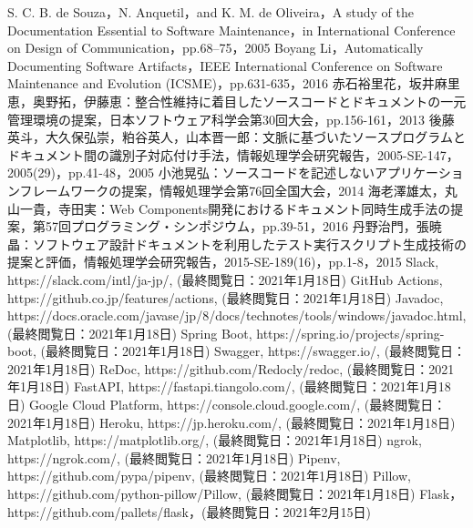 \begin{thebibliography}{30}
     S. C. B. de Souza，N. Anquetil，and K. M. de Oliveira，A study of the Documentation Essential to Software Maintenance，in International Conference on Design of Communication，pp.68–75，2005
     Boyang Li，Automatically Documenting Software Artifacts，IEEE International Conference on Software Maintenance and Evolution (ICSME)，pp.631-635，2016
     赤石裕里花，坂井麻里恵，奥野拓，伊藤恵：整合性維持に着目したソースコードとドキュメントの一元管理環境の提案，日本ソフトウェア科学会第30回大会，pp.156-161，2013
     後藤英斗，大久保弘崇，粕谷英人，山本晋一郎：文脈に基づいたソースプログラムとドキュメント間の識別子対応付け手法，情報処理学会研究報告，2005-SE-147，2005(29)，pp.41-48，2005
     小池晃弘：ソースコードを記述しないアプリケーションフレームワークの提案，情報処理学会第76回全国大会，2014
     海老澤雄太，丸山一貴，寺田実：Web Components開発におけるドキュメント同時生成手法の提案，第57回プログラミング・シンポジウム，pp.39-51，2016
     丹野治門，張暁晶：ソフトウェア設計ドキュメントを利用したテスト実行スクリプト生成技術の提案と評価，情報処理学会研究報告，2015-SE-189(16)，pp.1-8，2015
     Slack, https://slack.com/intl/ja-jp/, (最終閲覧日：2021年1月18日)
     GitHub Actions, https://github.co.jp/features/actions, (最終閲覧日：2021年1月18日)
     Javadoc, https://docs.oracle.com/javase/jp/8/docs/technotes/tools/windows/javadoc.html, (最終閲覧日：2021年1月18日)
     Spring Boot, https://spring.io/projects/spring-boot, (最終閲覧日：2021年1月18日)
     Swagger, https://swagger.io/, (最終閲覧日：2021年1月18日)
     ReDoc, https://github.com/Redocly/redoc, (最終閲覧日：2021年1月18日)
     FastAPI, https://fastapi.tiangolo.com/, (最終閲覧日：2021年1月18日)
     Google Cloud Platform, https://console.cloud.google.com/, (最終閲覧日：2021年1月18日)
     Heroku, https://jp.heroku.com/, (最終閲覧日：2021年1月18日)
     Matplotlib, https://matplotlib.org/, (最終閲覧日：2021年1月18日)
     ngrok, https://ngrok.com/, (最終閲覧日：2021年1月18日)
     Pipenv, https://github.com/pypa/pipenv, (最終閲覧日：2021年1月18日)
     Pillow, https://github.com/python-pillow/Pillow, (最終閲覧日：2021年1月18日)
     Flask，https://github.com/pallets/flask，(最終閲覧日：2021年2月15日)
\end{thebibliography}